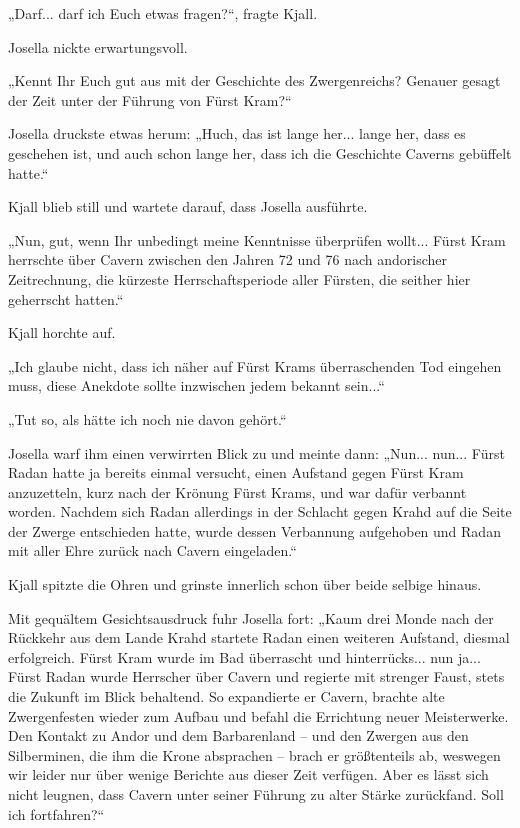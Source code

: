 „Darf... darf ich Euch etwas fragen?“, fragte Kjall.

Josella nickte erwartungsvoll.

„Kennt Ihr Euch gut aus mit der Geschichte des Zwergenreichs? Genauer gesagt der Zeit unter der Führung von Fürst Kram?“

Josella druckste etwas herum: „Huch, das ist lange her... lange her, dass es geschehen ist, und auch schon lange her, dass ich die Geschichte Caverns gebüffelt hatte.“

Kjall blieb still und wartete darauf, dass Josella ausführte.

„Nun, gut, wenn Ihr unbedingt meine Kenntnisse überprüfen wollt... Fürst Kram herrschte über Cavern zwischen den Jahren 72 und 76 nach andorischer Zeitrechnung, die kürzeste Herrschaftsperiode aller Fürsten, die seither hier geherrscht hatten.“

Kjall horchte auf.

„Ich glaube nicht, dass ich näher auf Fürst Krams überraschenden Tod eingehen muss, diese Anekdote sollte inzwischen jedem bekannt sein...“

„Tut so, als hätte ich noch nie davon gehört.“

Josella warf ihm einen verwirrten Blick zu und meinte dann: „Nun... nun... Fürst Radan hatte ja bereits einmal versucht, einen Aufstand gegen Fürst Kram anzuzetteln, kurz nach der Krönung Fürst Krams, und war dafür verbannt worden. Nachdem sich Radan allerdings in der Schlacht gegen Krahd auf die Seite der Zwerge entschieden hatte, wurde dessen Verbannung aufgehoben und Radan mit aller Ehre zurück nach Cavern eingeladen.“

Kjall spitzte die Ohren und grinste innerlich schon über beide selbige hinaus.

Mit gequältem Gesichtsausdruck fuhr Josella fort: „Kaum drei Monde nach der Rückkehr aus dem Lande Krahd startete Radan einen weiteren Aufstand, diesmal erfolgreich. Fürst Kram wurde im Bad überrascht und hinterrücks... nun ja... Fürst Radan wurde Herrscher über Cavern und regierte mit strenger Faust, stets die Zukunft im Blick behaltend. So expandierte er Cavern, brachte alte Zwergenfesten wieder zum Aufbau und befahl die Errichtung neuer Meisterwerke. Den Kontakt zu Andor und dem Barbarenland – und den Zwergen aus den Silberminen, die ihm die Krone absprachen – brach er größtenteils ab, weswegen wir leider nur über wenige Berichte aus dieser Zeit verfügen. Aber es lässt sich nicht leugnen, dass Cavern unter seiner Führung zu alter Stärke zurückfand. Soll ich fortfahren?“

